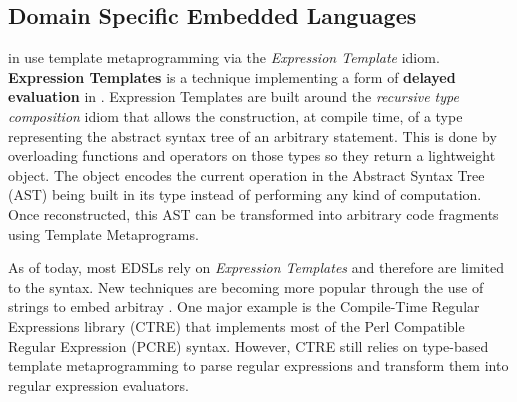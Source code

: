 \documentclass[../main]{subfiles}
\begin{document}

\subsection{
  \cpp Domain Specific Embedded Languages
}

\dsels in \cpp use template metaprogramming via the \textit{Expression
Template} idiom.
\textbf{Expression Templates} \cite{veldhuizen:1995,vandevoorde:2002} is a
technique implementing a form of \textbf{delayed evaluation} in
\cpp \cite{spinellis:2001}. Expression Templates are built around the
\textit{recursive type composition} idiom \cite{jarvi:1998} that allows the
construction, at compile time, of a type representing the abstract syntax tree
of an arbitrary statement. This is done by overloading functions and operators
on those types so they return a lightweight object.
The object encodes the current operation in the Abstract Syntax Tree
(AST) being built in its type instead of performing any kind of computation.
Once reconstructed, this AST can be transformed into arbitrary code fragments
using Template Metaprograms.

As of today, most \cpp EDSLs rely on \textit{Expression Templates} and therefore
are limited to the \cpp syntax. New techniques are becoming more popular through
the use of \constexpr strings to embed arbitray \dsels. One major example is
the Compile-Time Regular Expressions library (CTRE) \cite{ctre} that implements
most of the Perl Compatible Regular Expression (PCRE) syntax. However, CTRE
still relies on type-based template metaprogramming to parse regular expressions
and transform them into regular expression evaluators.


\end{document}
